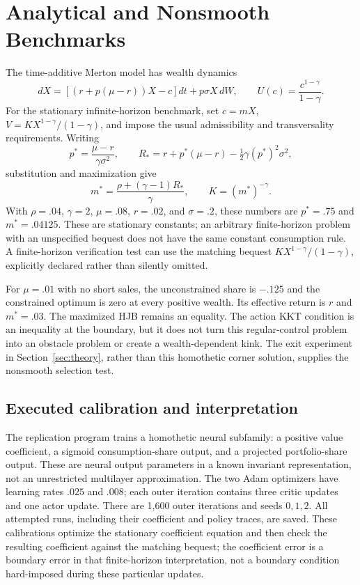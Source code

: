\section{Analytical and Nonsmooth Benchmarks}\label{sec:benchmarks}
The time-additive Merton model has wealth dynamics
\[
 dX=[(r+p(\mu-r))X-c]dt+p\sigma X\,dW,
 \qquad U(c)=\frac{c^{1-\gamma}}{1-\gamma}.
\]
For the stationary infinite-horizon benchmark, set $c=mX$, $V=KX^{1-\gamma}/(1-\gamma)$, and impose the usual admissibility and transversality requirements. Writing
\[
 p^*=\frac{\mu-r}{\gamma\sigma^2},\qquad
 R_*=r+p^*(\mu-r)-\tfrac12\gamma(p^*)^2\sigma^2,
\]
substitution and maximization give
\begin{equation}\label{eq:merton}
 m^*=\frac{\rho+(\gamma-1)R_*}{\gamma},\qquad K=(m^*)^{-\gamma}.
\end{equation}
With $\rho=.04$, $\gamma=2$, $\mu=.08$, $r=.02$, and $\sigma=.2$, these numbers are $p^*=.75$ and $m^*=.04125$. These are stationary constants; an arbitrary finite-horizon problem with an unspecified bequest does not have the same constant consumption rule. A finite-horizon verification test can use the matching bequest $KX^{1-\gamma}/(1-\gamma)$, explicitly declared rather than silently omitted.

For $\mu=.01$ with no short sales, the unconstrained share is $-.125$ and the constrained optimum is zero at every positive wealth. Its effective return is $r$ and $m^*=.03$. The maximized HJB remains an equality. The action KKT condition is an inequality at the boundary, but it does not turn this regular-control problem into an obstacle problem or create a wealth-dependent kink. The exit experiment in Section~\ref{sec:theory}, rather than this homothetic corner solution, supplies the nonsmooth selection test.

\subsection{Executed calibration and interpretation}
The replication program trains a homothetic neural subfamily: a positive value coefficient, a sigmoid consumption-share output, and a projected portfolio-share output. These are neural output parameters in a known invariant representation, not an unrestricted multilayer approximation. The two Adam optimizers have learning rates $.025$ and $.008$; each outer iteration contains three critic updates and one actor update. There are 1,600 outer iterations and seeds $0,1,2$. All attempted runs, including their coefficient and policy traces, are saved. These calibrations optimize the stationary coefficient equation and then check the resulting coefficient against the matching bequest; the coefficient error is a boundary error in that finite-horizon interpretation, not a boundary condition hard-imposed during these particular updates.

